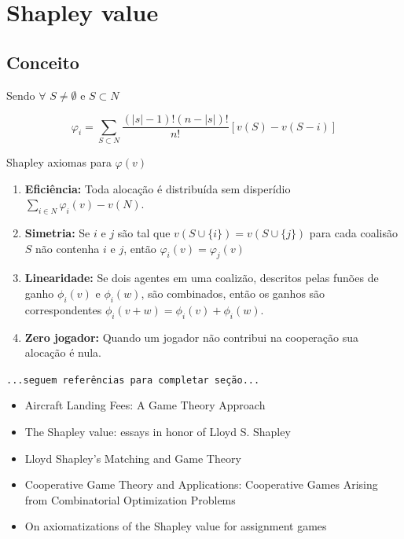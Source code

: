 \documentclass[
	article,			        %
	11pt,				          %
	oneside,			        %
	a4paper,			        %
	english,			        %
	brazil,				        %
	sumario=tradicional
]{abntex2}\usepackage[]{graphicx}\usepackage[]{color}
\begin{document}
\section{Shapley value}

\subsection{Conceito}

Sendo $\forall$ $S \neq \emptyset$ e $S \subset N$

\begin{equation}
  \label{eq:shaVal}
  \varphi _{i} = \sum_{S \subset N} \frac{(|s| - 1)!(n - |s|)!}{n!}[v(S)-v(S - i)]
\end{equation}

Shapley axiomas para $\varphi(v)$
\begin{enumerate}
  \item \textbf{Efici\^encia:} Toda aloca\c{c}\~ao \'e distribuída sem disperídio $\sum_{i \in N} \varphi_i(v) - v(N)$.
  \item \textbf{Simetria:} Se $i$ e $j$ são tal que $v(S \cup \{i\}) = v(S \cup \{j\})$ para cada coalisão $S$ não contenha $i$ e $j$, então $\varphi_i (v) = \varphi_j (v)$
  \item \textbf{Linearidade:} Se dois agentes em uma coaliz\~ao, descritos pelas fun\~oes de ganho $\phi_i(v)$ e $\phi_i(w)$, s\~ao combinados, ent\~ao os ganhos s\~ao correspondentes $\phi_i(v + w) = \phi_i(v) + \phi_i(w)$.
  \item \textbf{Zero jogador:} Quando um jogador n\~ao contribui na coopera\c{c}\~ao sua aloca\c{c}\~ao \'e nula.
\end{enumerate}

  \texttt{\color{red}...seguem refer\^encias para completar seção...}
  \begin{itemize}
    \item Aircraft Landing Fees: A Game Theory Approach \cite{Littlechild.1977}
    \item The Shapley value: essays in honor of Lloyd S. Shapley \cite{Alvin.1988}
    \item Lloyd Shapley's Matching and Game Theory \cite{Serrano.2013}
    \item Cooperative Game Theory and Applications: Cooperative Games Arising from Combinatorial Optimization Problems \cite{Curiel.2013}
    \item On axiomatizations of the Shapley value for assignment games \cite{Brink.2015}
  \end{itemize}
\end{document}
